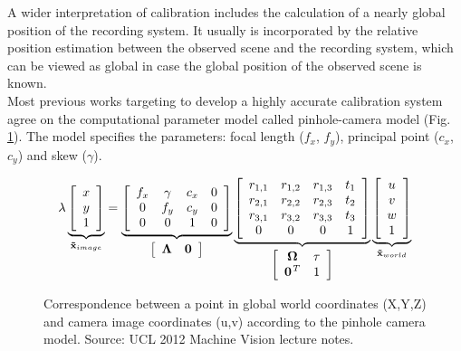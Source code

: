 \documentclass{ucl_thesis}
\newcommand{\figref}[1]{(Fig. \ref{#1})}
\begin{document}
A wider interpretation of calibration includes the calculation of a nearly global position of the recording system. It usually is incorporated by the relative position estimation between the observed scene and the recording system, which can be viewed as global in case the global position of the observed scene is known. \\

Most previous works targeting to develop a highly accurate calibration system agree on the computational parameter model called pinhole-camera model \figref{eq:pinhole}. The model specifies the parameters: focal length ($f_x$, $f_y$), principal point ($c_x$, $c_y$) and skew ($\gamma$).

\begin{figure}[h!]
\begin{equation}
\lambda
\underbrace{
	\left[\begin{array}{ccc}
	    x \\
	    y \\
	    1 \\
	\end{array} \right]
}_{
	{\bf \tilde{x}}_{image}
}
%
=
%
\underbrace{
	\left[\begin{array}{cccc}
			f_x & \gamma & c_x & 0 \\
			0   & f_y    & c_y & 0 \\
	 		0   & 0      & 1   & 0 \\
	\end{array} \right]
}_{
	\left[\begin{array}{cc}
		\bf{\Lambda} & \bf{0}
	\end{array} \right]
}
%
\underbrace{
	\left[\begin{array}{cccc}
	    r_{1,1} & r_{1,2} & r_{1,3} & t_1 \\
	    r_{2,1} & r_{2,2} & r_{2,3} & t_2 \\
	    r_{3,1} & r_{3,2} & r_{3,3} & t_3 \\
	    0       & 0       & 0       & 1 \\
	\end{array} \right]
}_{
	\left[\begin{array}{cc}
		\bf{\Omega}     & \bf{\tau} \\
		\bf{0}^{\it{T}} 	& 1		      \\
	\end{array} \right]
}
%
\underbrace{
	\left[\begin{array}{c}
	    u \\
	    v \\
	    w \\
	    1 \\
	\end{array} \right]
}_{
	{\bf \tilde{x}}_{world}
}
\end{equation}
\caption{Correspondence between a point in global world coordinates (X,Y,Z) and camera image coordinates (u,v) according to the pinhole camera model. Source: UCL 2012 Machine Vision lecture notes. }
\label{eq:pinhole}
\end{figure}
\end{document}
